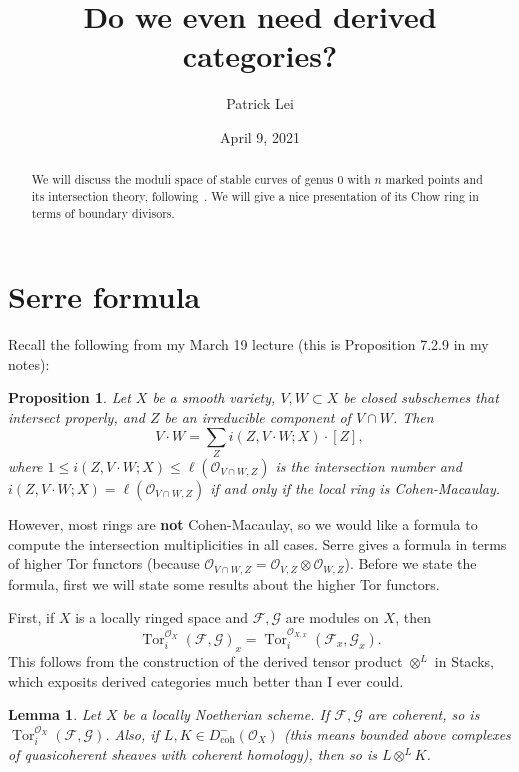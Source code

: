 \documentclass{amsart}
\title{Do we even need derived categories?}
\author{Patrick Lei}
\date{April 9, 2021}
\newtheorem{lem}[thm]{Lemma}
\theoremstyle{definition}
\theoremstyle{remark}
\theoremstyle{plain}
\newtheorem*{prop*}{Proposition}
\theoremstyle{definition}
\theoremstyle{remark}
\newcommand{\msc}[1]{\mathscr{#1}}
\newcommand{\mr}[1]{\mathrm{#1}}
\DeclareMathOperator{\Tor}{Tor}
\begin{document}
    
\maketitle

\begin{abstract}
    We will discuss the moduli space of stable curves of genus $0$ with $n$ marked points and its intersection theory, following~\cite{keel}. We will give a nice presentation of its Chow ring in terms of boundary divisors.
\end{abstract}

\section{Serre formula}%
\label{sec:serre_formula}

Recall the following from my March 19 lecture (this is Proposition 7.2.9 in my notes):
\begin{prop*}
    Let $X$ be a smooth variety, $V, W \subset X$ be closed subschemes that intersect properly, and $Z$ be an irreducible component of $V \cap W$. Then
    \[ V \cdot W = \sum_Z i(Z, V \cdot W; X) \cdot [Z], \]
    where $1 \leq i(Z, V \cdot W; X) \leq \ell(\msc{O}_{V \cap W, Z})$ is the intersection number and $i(Z, V \cdot W; X) = \ell(\msc{O}_{V \cap W, Z})$ if and only if the local ring is Cohen-Macaulay.
\end{prop*}

However, most rings are \textbf{not} Cohen-Macaulay, so we would like a formula to compute the intersection multiplicities in all cases. Serre gives a formula in terms of higher Tor functors (because $\msc{O}_{V \cap W, Z} = \msc{O}_{V, Z} \otimes \msc{O}_{W, Z}$). Before we state the formula, first we will state some results about the higher Tor functors. 

First, if $X$ is a locally ringed space and $\msc{F}, \msc{G}$ are modules on $X$, then 
\[ {\Tor_i^{\msc{O}_X}(\msc{F}, \msc{G})}_x = \Tor_i^{\msc{O}_{X,x}}(\msc{F}_x, \msc{G}_x). \]
This follows from the construction of the derived tensor product $\otimes^L$ in Stacks, which exposits derived categories much better than I ever could.

\begin{lem}
    Let $X$ be a locally Noetherian scheme. If $\msc{F}, \msc{G}$ are coherent, so is $\Tor_i^{\msc{O}_X}(\msc{F}, \msc{G})$. Also, if $L, K \in D^-_{\mr{coh}}(\msc{O}_X)$ (this means bounded above complexes of quasicoherent sheaves with coherent homology), then so is $L \otimes^L K$.
\end{lem}
\end{document}
